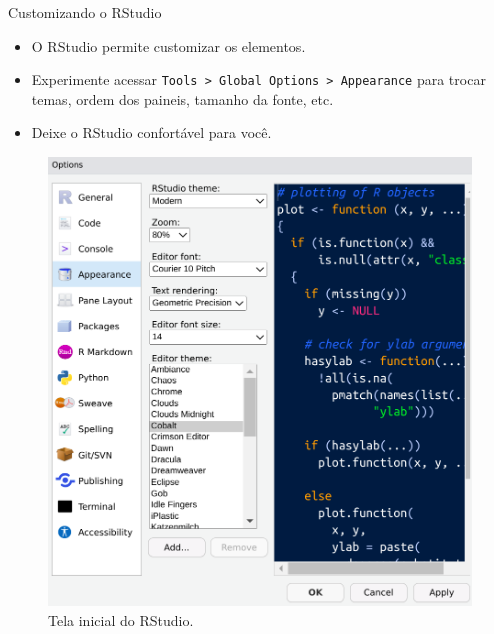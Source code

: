 \documentclass[
  ignorenonframetext,
  serif,
  professionalfont,
  usenames,
  dvipsnames,
  aspectratio = 169]{beamer}
\providecommand{\tightlist}{%
  \setlength{\itemsep}{0pt}\setlength{\parskip}{0pt}}
\renewcommand{\tightlist}{%
  \setlength{\itemsep}{0\baselineskip}
  \setlength{\parskip}{0.25\baselineskip}
}
\def\beginAHalfColumn{\begin{minipage}{0.49\textwidth}}%
\def\endColumns{\end{minipage}}%
\begin{document}
\begin{frame}[fragile]{Customizando o RStudio}
\label{customizando-o-rstudio}
\beginAHalfColumn

\begin{itemize}
\tightlist
\item
  O RStudio permite customizar os elementos.
\end{itemize}

\vspace{0.3cm}

\begin{itemize}
\tightlist
\item
  Experimente acessar
  \texttt{Tools\ \textgreater{}\ Global\ Options\ \textgreater{}\ Appearance}
  para trocar temas, ordem dos paineis, tamanho da fonte, etc.
\end{itemize}

\vspace{0.3cm}

\begin{itemize}
\tightlist
\item
  Deixe o RStudio confortável para você.
\end{itemize}

\endColumns
\beginAHalfColumn

\begin{figure}

{\centering \includegraphics[width=0.85\linewidth]{./img/aparencia} 

}

\caption{Tela inicial do RStudio.}\label{fig:unnamed-chunk-16}
\end{figure}

\endColumns
\end{frame}
\end{document}
